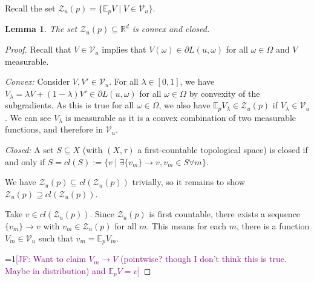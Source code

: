 \documentclass{article}
\newcommand{\Comments}{1}
\newcommand{\mynote}[2]{\ifnum\Comments=1\textcolor{#1}{#2}\fi}
\newcommand{\mytodo}[2]{\ifnum\Comments=1%
	\todo[linecolor=#1!80!black,backgroundcolor=#1,bordercolor=#1!80!black]{#2}\fi}
\newcommand{\jessie}[1]{\mynote{purple}{[JF: #1]}}
\newcommand{\jessiet}[1]{\mytodo{purple!20!white}{JF: #1}}
\newcommand{\reals}{\mathbb{R}}
\newcommand{\E}{\mathbb{E}}
\newcommand{\V}{\mathcal{V}}
\newcommand{\Y}{\mathcal{Y}}
\newcommand{\Z}{\mathcal{Z}}
\newtheorem{lemma}{Lemma}
\begin{document}
Recall the set $\Z_u(p) = \{\E_p V \mid V \in \V_u\}$.
\begin{lemma}\label{lem:Z-convex-closed}
	The set $\Z_u(p) \subseteq \reals^d$ is convex and closed.
\end{lemma}
\begin{proof}
	Recall that $V \in \V_u$ implies that $V(\omega) \in \partial L(u,\omega)$ for all $\omega \in \Omega$ and $V$ measurable.
	
	\emph{Convex: }
	Consider $V, V' \in \V_u$.
	For all $\lambda \in [0,1]$, we have $V_\lambda = \lambda V + (1-\lambda) V' \in \partial L(u,\omega)$ for all $\omega \in \Omega$ by convexity of the subgradients.
	As this is true for all $\omega \in \Omega$, we also have $\E_p V_\lambda \in \Z_u(p)$ if $V_\lambda \in \V_u$.
	We can see $V_\lambda$ is measurable as it is a convex combination of two measurable functions, and therefore in $\V_u$.
	
	\emph{Closed: } A set $S \subseteq X$ (with $(X,\tau)$ a first-countable topological space) is closed if and only if $S = cl(S) := \{v \mid \exists \{v_m\} \to v, v_m \in S \forall m\}$.
	
	We have $\Z_u(p) \subseteq cl(\Z_u(p))$ trivially, so it remains to show $\Z_u(p) \supseteq cl(\Z_u(p))$.
	
	Take $v \in cl(\Z_u(p))$.
	Since $\Z_u(p)$ is first countable, there exists a sequence $\{v_m\} \to v$ with $v_m \in \Z_u(p)$ for all $m$.
	This means for each $m$, there is a function $V_m \in \V_u$ such that $v_m = \E_p V_m$.

	\jessie{Want to claim $V_m \to V$ (pointwise? though I don't think this is true.  Maybe in distribution) and $\E_p V = v$}	
	
\end{proof}

%
%
%
%
\end{document}
